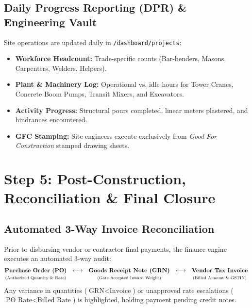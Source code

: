 \documentclass[11pt,a4paper]{article}
\begin{document}
\subsection{Daily Progress Reporting (DPR) \& Engineering Vault}
Site operations are updated daily in \texttt{/dashboard/projects}:
\begin{itemize}[noitemsep]
    \item \textbf{Workforce Headcount:} Trade-specific counts (Bar-benders, Masons, Carpenters, Welders, Helpers).
    \item \textbf{Plant \& Machinery Log:} Operational vs. idle hours for Tower Cranes, Concrete Boom Pumps, Transit Mixers, and Excavators.
    \item \textbf{Activity Progress:} Structural pours completed, linear meters plastered, and hindrances encountered.
    \item \textbf{GFC Stamping:} Site engineers execute exclusively from \textit{Good For Construction} stamped drawing sheets.
\end{itemize}

\newpage

\section{Step 5: Post-Construction, Reconciliation \& Final Closure}

\subsection{Automated 3-Way Invoice Reconciliation}
Prior to disbursing vendor or contractor final payments, the finance engine executes an automated 3-way audit:
\begin{equation}
    \begin{matrix}
        \text{\textbf{Purchase Order (PO)}} & \longleftrightarrow & \text{\textbf{Goods Receipt Note (GRN)}} & \longleftrightarrow & \text{\textbf{Vendor Tax Invoice}} \\
        \text{\scriptsize(Authorized Quantity \& Rate)} & & \text{\scriptsize(Gate Accepted Inward Weight)} & & \text{\scriptsize(Billed Amount \& GSTIN)}
    \end{matrix}
\end{equation}
Any variance in quantities ($\text{GRN} < \text{Invoice}$) or unapproved rate escalations ($\text{PO Rate} < \text{Billed Rate}$) is highlighted, holding payment pending credit notes.
\end{document}
